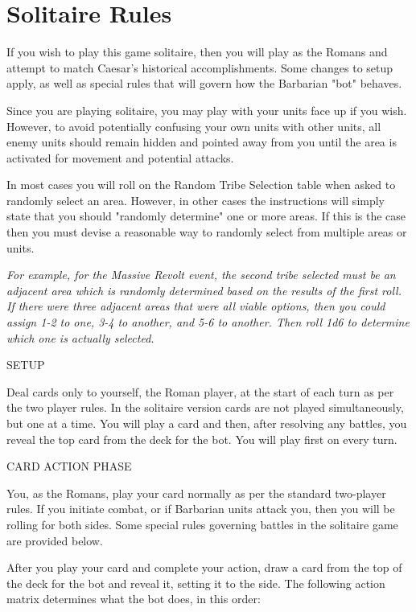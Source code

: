 \section{Solitaire Rules}

If you wish to play this game solitaire, then you will play as the Romans and attempt to match Caesar's historical accomplishments. Some changes to setup apply, as well as special rules that will govern how the Barbarian "bot" behaves.

Since you are playing solitaire, you may play with your units face up if you wish. However, to avoid potentially confusing your own units with other units, all enemy units should remain hidden and pointed away from you until the area is activated for movement and potential attacks.

In most cases you will roll on the Random Tribe Selection table when asked to randomly select an area. However, in other cases the instructions will simply state that you should "randomly determine" one or more areas. If this is the case then you must devise a reasonable way to randomly select from multiple areas or units.

\textit{For example, for the Massive Revolt event, the second tribe selected must be an adjacent area which is randomly determined based on the results of the first roll. If there were three adjacent areas that were all viable options, then you could assign 1-2 to one, 3-4 to another, and 5-6 to another. Then roll 1d6 to determine which one is actually selected.}

SETUP

Deal cards only to yourself, the Roman player, at the start of each turn as per the two player rules. In the solitaire version cards are not played simultaneously, but one at a time. You will play a card and then, after resolving any battles, you reveal the top card from the deck for the bot. You will play first on every turn.

CARD ACTION PHASE

You, as the Romans, play your card normally as per the standard two-player rules. If you initiate combat, or if Barbarian units attack you, then you will be rolling for both sides. Some special rules governing battles in the solitaire game are provided below.

After you play your card and complete your action, draw a card from the top of the deck for the bot and reveal it, setting it to the side. The following action matrix determines what the bot does, in this order:


